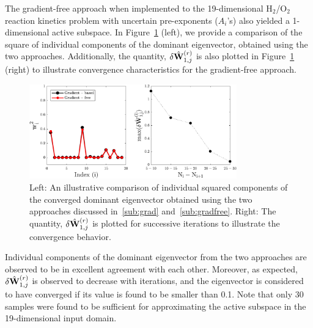 The gradient-free approach when implemented to the 19-dimensional H$_2$/O$_2$ reaction kinetics problem
with uncertain pre-exponents ($A_i$'s) also yielded a 1-dimensional active subspace. In Figure~\ref{fig:comp} (left),
we provide a comparison of the square of individual components of the dominant eigenvector, obtained using the two 
approaches.
Additionally, the quantity, $\delta \hat{\mathbf{{W}}}_{1,j}^{(r)}$ is also plotted in
Figure~\ref{fig:comp} (right) to illustrate convergence characteristics for the gradient-free approach.
%
\begin{figure}[htbp]
 \begin{center}
  \includegraphics[width=0.8\textwidth]{./Figures/eigv6}
\caption{Left: An illustrative comparison of individual squared components of the converged dominant eigenvector obtained
using the two approaches discussed in~\ref{sub:grad} and~\ref{sub:gradfree}. Right: The quantity,  $\delta \hat{\mathbf{{W}}}_{1,j}^{(r)}$
is plotted for successive iterations to illustrate the convergence behavior.}
\label{fig:comp}
\end{center}
\end{figure}
%
Individual components of the dominant eigenvector from the two approaches are observed to be in excellent
agreement with each other. Moreover, as expected,  $\delta \hat{\mathbf{{W}}}_{1,j}^{(r)}$ is observed to decrease with iterations, and
the eigenvector is considered to have converged if its value is found to be smaller than 0.1. Note that only 30 samples
were found to be sufficient for approximating the active subspace in the 19-dimensional input domain. 

